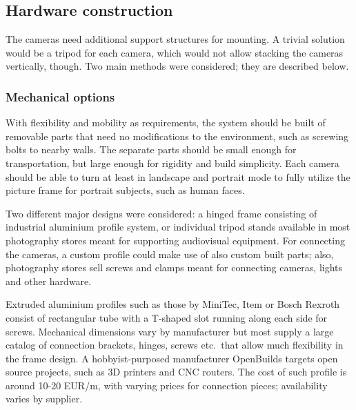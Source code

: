 

\subsection{Hardware construction} %

The cameras need additional support structures for mounting.
A trivial solution would be a tripod for each camera, which would not allow stacking the cameras vertically, though.
Two main methods were considered; they are described below.

\subsubsection{Mechanical options}

With flexibility and mobility as requirements, the system should be built of removable parts that need no modifications to the environment, such as screwing bolts to nearby walls.
The separate parts should be small enough for transportation, but large enough for rigidity and build simplicity.
Each camera should be able to turn at least in landscape and portrait mode to fully utilize the picture frame for portrait subjects, such as human faces.

Two different major designs were considered: a hinged frame consisting of industrial aluminium profile system, or individual tripod stands available in most photography stores meant for supporting audiovisual equipment.
For connecting the cameras, a custom profile could make use of also custom built parts; also, photography stores sell screws and clamps meant for connecting cameras, lights and other hardware.

Extruded aluminium profiles such as those by MiniTec, Item or Bosch Rexroth consist of rectangular tube with a T-shaped slot running along each side for screws. %
Mechanical dimensions vary by manufacturer but most supply a large catalog of connection brackets, hinges, screws etc.\ that allow much flexibility in the frame design.
A hobbyist-purposed manufacturer OpenBuilds targets open source projects, such as 3D printers and CNC routers.
The cost of such profile is around 10-20 EUR/m, with varying prices for connection pieces; availability varies by supplier.


